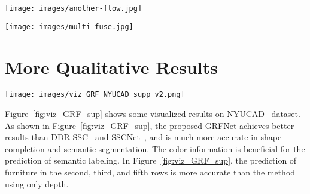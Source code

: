 \documentclass[10pt,twocolumn,letterpaper]{article}
\begin{document}
\begin{figure*}[t]
\begin{center}
{
\texttt{[image: images/another-flow.jpg]}
}
\caption{Network workflow with GRF fusion block}
\label{fig:GRF_fusion}

\end{center}
\end{figure*}



\begin{figure*}[t]
\begin{center}
{
\texttt{[image: images/multi-fuse.jpg]}
}
\caption{Network workflow with other fusion blocks}
\vspace{-0.6cm}
\label{fig:other_fusion}

\end{center}
\end{figure*}



\section{More Qualitative Results}

\begin{figure*}[t]
\begin{center}
{
\texttt{[image: images/viz\_GRF\_NYUCAD\_supp\_v2.png]}
}
\caption{Qualitative results on NYUCAD. From left to right: Input RGB-D image,
ground truth, results obtained by our proposed GRFNet, results obtained by DDR-SSC~\cite{li2019rgbd} and SSCNet~\cite{song2017_SSCNet}. 
Overall, our completed semantic 3D scenes are less cluttered and show a higher voxel-wise accuracy compared to DDR-SSC and SSCNet.}
\vspace{-0.6cm}
\label{fig:viz_GRF_sup}

\end{center}
\end{figure*}



Figure~\ref{fig:viz_GRF_sup} shows some visualized results on NYUCAD~\cite{firman2016NYUCAD} dataset. As shown in Figure~\ref{fig:viz_GRF_sup}, the proposed GRFNet achieves better results than DDR-SSC~\cite{li2019rgbd} and SSCNet~\cite{song2017_SSCNet}, and is much more accurate in shape completion and semantic segmentation. 
The color information is beneficial for the prediction of semantic labeling.
In Figure~\ref{fig:viz_GRF_sup}, the prediction of furniture in the second, third, and fifth rows is more accurate than the method using only depth.
\end{document}
